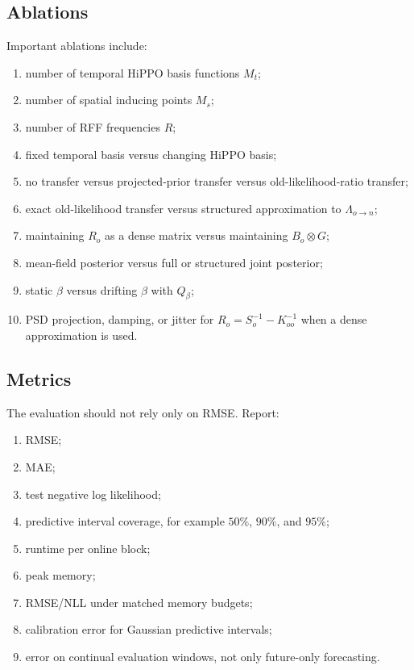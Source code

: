 \documentclass[12pt]{article}
\begin{document}
\subsection{Ablations}

Important ablations include:
\begin{enumerate}[label=(\arabic*)]
    \item number of temporal HiPPO basis functions \(M_t\);
    \item number of spatial inducing points \(M_s\);
    \item number of RFF frequencies \(R\);
    \item fixed temporal basis versus changing HiPPO basis;
    \item no transfer versus projected-prior transfer versus old-likelihood-ratio transfer;
    \item exact old-likelihood transfer versus structured approximation to
    \(\Lambda_{o\rightarrow n}\);
    \item maintaining \(R_o\) as a dense matrix versus maintaining \(B_o\otimes G\);
    \item mean-field posterior versus full or structured joint posterior;
    \item static \(\beta\) versus drifting \(\beta\) with \(Q_\beta\);
    \item PSD projection, damping, or jitter for \(R_o=S_o^{-1}-K_{oo}^{-1}\) when a
    dense approximation is used.
\end{enumerate}

\subsection{Metrics}

The evaluation should not rely only on RMSE. Report:
\begin{enumerate}[label=(\arabic*)]
    \item RMSE;
    \item MAE;
    \item test negative log likelihood;
    \item predictive interval coverage, for example \(50\%\), \(90\%\), and \(95\%\);
    \item runtime per online block;
    \item peak memory;
    \item RMSE/NLL under matched memory budgets;
    \item calibration error for Gaussian predictive intervals;
    \item error on continual evaluation windows, not only future-only forecasting.
\end{enumerate}
\end{document}

